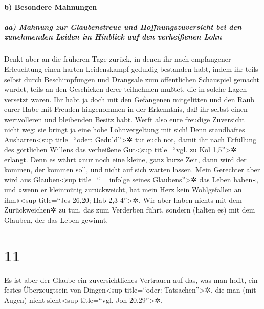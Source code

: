 \hypertarget{b-besondere-mahnungen}{%
\paragraph{b) Besondere Mahnungen}\label{b-besondere-mahnungen}}

\hypertarget{aa-mahnung-zur-glaubenstreue-und-hoffnungszuversicht-bei-den-zunehmenden-leiden-im-hinblick-auf-den-verheiuxdfenen-lohn}{%
\subparagraph{aa) Mahnung zur Glaubenstreue und Hoffnungszuversicht bei
den zunehmenden Leiden im Hinblick auf den verheißenen
Lohn}\label{aa-mahnung-zur-glaubenstreue-und-hoffnungszuversicht-bei-den-zunehmenden-leiden-im-hinblick-auf-den-verheiuxdfenen-lohn}}

 Denkt aber an die früheren Tage zurück, in denen ihr
nach empfangener Erleuchtung einen harten Leidenskampf geduldig
bestanden habt,  indem ihr teils selbst durch
Beschimpfungen und Drangsale zum öffentlichen Schauspiel gemacht wurdet,
teils an den Geschicken derer teilnehmen mußtet, die in solche Lagen
versetzt waren.  Ihr habt ja doch mit den Gefangenen
mitgelitten und den Raub eurer Habe mit Freuden hingenommen in der
Erkenntnis, daß ihr selbst einen wertvolleren und bleibenden Besitz
habt.  Werft also eure freudige Zuversicht nicht weg: sie
bringt ja eine hohe Lohnvergeltung mit sich!  Denn
standhaftes Ausharren\textless sup title=``oder: Geduld''\textgreater✲
tut euch not, damit ihr nach Erfüllung des göttlichen Willens das
verheißene Gut\textless sup title=``vgl. zu Kol 1,5''\textgreater✲
erlangt.  Denn es währt »nur noch eine kleine, ganz kurze
Zeit, dann wird der kommen, der kommen soll, und nicht auf sich warten
lassen.  Mein Gerechter aber wird aus
Glauben\textless sup title=``=~infolge seines Glaubens''\textgreater✲
das Leben haben«, und »wenn er kleinmütig zurückweicht, hat mein Herz
kein Wohlgefallen an ihm«\textless sup title=``Jes 26,20; Hab
2,3-4''\textgreater✲.  Wir aber haben nichts mit dem
Zurückweichen✲ zu tun, das zum Verderben führt, sondern (halten es) mit
dem Glauben, der das Leben gewinnt.

\hypertarget{section-10}{%
\section{11}\label{section-10}}

 Es ist aber der Glaube ein zuversichtliches Vertrauen auf
das, was man hofft, ein festes Überzeugtsein von Dingen\textless sup
title=``oder: Tatsachen''\textgreater✲, die man (mit Augen) nicht
sieht\textless sup title=``vgl. Joh 20,29''\textgreater✲.

